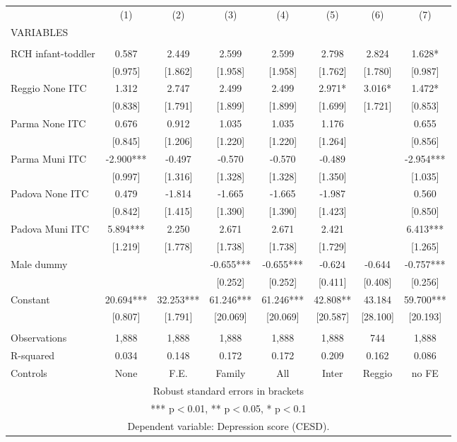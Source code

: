 \begin{tabular}{lccccccc} \hline
 & (1) & (2) & (3) & (4) & (5) & (6) & (7) \\
VARIABLES &  &  &  &  &  &  &  \\ \hline
 &  &  &  &  &  &  &  \\
RCH infant-toddler & 0.587 & 2.449 & 2.599 & 2.599 & 2.798 & 2.824 & 1.628* \\
 & [0.975] & [1.862] & [1.958] & [1.958] & [1.762] & [1.780] & [0.987] \\
Reggio None ITC & 1.312 & 2.747 & 2.499 & 2.499 & 2.971* & 3.016* & 1.472* \\
 & [0.838] & [1.791] & [1.899] & [1.899] & [1.699] & [1.721] & [0.853] \\
Parma None ITC & 0.676 & 0.912 & 1.035 & 1.035 & 1.176 &  & 0.655 \\
 & [0.845] & [1.206] & [1.220] & [1.220] & [1.264] &  & [0.856] \\
Parma Muni ITC & -2.900*** & -0.497 & -0.570 & -0.570 & -0.489 &  & -2.954*** \\
 & [0.997] & [1.316] & [1.328] & [1.328] & [1.350] &  & [1.035] \\
Padova None ITC & 0.479 & -1.814 & -1.665 & -1.665 & -1.987 &  & 0.560 \\
 & [0.842] & [1.415] & [1.390] & [1.390] & [1.423] &  & [0.850] \\
Padova Muni ITC & 5.894*** & 2.250 & 2.671 & 2.671 & 2.421 &  & 6.413*** \\
 & [1.219] & [1.778] & [1.738] & [1.738] & [1.729] &  & [1.265] \\
Male dummy &  &  & -0.655*** & -0.655*** & -0.624 & -0.644 & -0.757*** \\
 &  &  & [0.252] & [0.252] & [0.411] & [0.408] & [0.256] \\
Constant & 20.694*** & 32.253*** & 61.246*** & 61.246*** & 42.808** & 43.184 & 59.700*** \\
 & [0.807] & [1.791] & [20.069] & [20.069] & [20.587] & [28.100] & [20.193] \\
 &  &  &  &  &  &  &  \\
Observations & 1,888 & 1,888 & 1,888 & 1,888 & 1,888 & 744 & 1,888 \\
R-squared & 0.034 & 0.148 & 0.172 & 0.172 & 0.209 & 0.162 & 0.086 \\
 Controls & None & F.E. & Family & All & Inter & Reggio & no FE \\ \hline
\multicolumn{8}{c}{ Robust standard errors in brackets} \\
\multicolumn{8}{c}{ *** p$<$0.01, ** p$<$0.05, * p$<$0.1} \\
\multicolumn{8}{c}{ Dependent variable: Depression score (CESD).} \\
\end{tabular}
